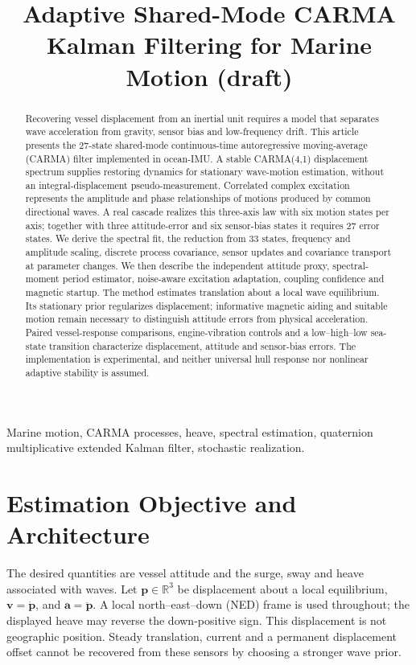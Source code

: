 \documentclass[conference]{IEEEtran}
\title{Adaptive Shared-Mode CARMA\\
Kalman Filtering for Marine Motion (draft)}
\author{%
  \IEEEauthorblockN{Mikhail S. Grushinskiy}
  \IEEEauthorblockA{Independent Researcher, USA, Fair Lawn\\
  Bareboat Necessities GitHub Project\\
  Email: mgrouch@users.github.com}%
}
\newcommand{\vc}[1]{\bm{#1}}
\newcommand{\R}{\mathbb R}
\begin{document}
\maketitle

\begin{abstract}
Recovering vessel displacement from an inertial unit requires a model that
separates wave acceleration from gravity, sensor bias and low-frequency
drift. This article presents the 27-state shared-mode continuous-time
autoregressive moving-average (CARMA) filter implemented in ocean-IMU.
A stable CARMA(4,1) displacement spectrum supplies restoring dynamics
for stationary wave-motion estimation, without an integral-displacement
pseudo-measurement. Correlated complex excitation represents the amplitude
and phase relationships of motions produced by common directional waves.
A real cascade realizes this three-axis law with six motion states per
axis; together with three attitude-error and six sensor-bias states it
requires 27 error states. We derive the spectral fit, the reduction from
33 states, frequency and amplitude scaling, discrete process covariance,
sensor updates and covariance transport at parameter changes. We then
describe the independent attitude proxy, spectral-moment period estimator,
noise-aware excitation adaptation, coupling confidence and magnetic startup.
The method estimates translation about a local wave equilibrium. Its
stationary prior regularizes displacement; informative magnetic aiding and
suitable motion remain necessary to distinguish attitude errors from
physical acceleration. Paired vessel-response comparisons, engine-vibration
controls and a low--high--low sea-state transition characterize displacement,
attitude and sensor-bias errors. The implementation is experimental, and neither
universal hull response nor nonlinear adaptive stability is assumed.
\end{abstract}

\begin{IEEEkeywords}
Marine motion, CARMA processes, heave, spectral estimation, quaternion
multiplicative extended Kalman filter, stochastic realization.
\end{IEEEkeywords}

\section{Estimation Objective and Architecture}
\label{sec:objective}
The desired quantities are vessel attitude and the surge, sway and heave
associated with waves. Let $\vc p\in\R^3$ be displacement about a local
equilibrium, $\vc v=\dot{\vc p}$, and $\vc a=\ddot{\vc p}$. A local
north--east--down (NED) frame is used throughout; the displayed heave may
reverse the down-positive sign. This displacement is not geographic
position. Steady translation, current and a permanent displacement offset
cannot be recovered from these sensors by choosing a stronger wave prior.
\end{document}
